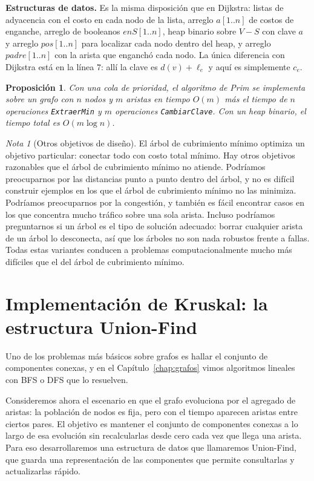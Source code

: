 \documentclass[12pt, spanish, oneside, openany]{book}
\newenvironment{estructuras}%
  {\begin{center}\begin{minipage}{0.93\textwidth}\begin{mdframed}[style=estrbox]%
   \small\textbf{Estructuras de datos.}\;}%
  {\end{mdframed}\end{minipage}\end{center}}
\theoremstyle{uprightplain}
\newtheorem{proposicion}[teorema]{Proposición}
\theoremstyle{definition}
\theoremstyle{remark}
\newtheorem{nota}[teorema]{Nota}
\theoremstyle{definition}
\begin{document}
\begin{estructuras}
Es la misma disposición que en Dijkstra: listas de adyacencia con el costo en
cada nodo de la lista, arreglo $a[1..n]$ de costos de enganche, arreglo de
booleanos $\mathit{enS}[1..n]$, heap binario sobre $V-S$ con clave $a$ y
arreglo $\mathit{pos}[1..n]$ para localizar cada nodo dentro del heap, y
arreglo $\mathit{padre}[1..n]$ con la arista que enganchó cada nodo. La única
diferencia con Dijkstra está en la línea $7$: allí la clave es $d(v)+\ell_e$ y
aquí es simplemente $c_e$.
\end{estructuras}

\begin{proposicion}
\label{prop:prim-tiempo}
Con una cola de prioridad, el algoritmo de Prim se implementa sobre un grafo con $n$ nodos y $m$ aristas en tiempo $O(m)$ más el tiempo de $n$ operaciones \texttt{ExtraerMin} y $m$ operaciones \texttt{CambiarClave}. Con un heap binario, el tiempo total es $O(m\log n)$.
\end{proposicion}

\begin{nota}[Otros objetivos de diseño]
El árbol de cubrimiento mínimo optimiza un objetivo particular: conectar todo con costo total mínimo. Hay otros objetivos razonables que el árbol de cubrimiento mínimo no atiende. Podríamos preocuparnos por las distancias punto a punto dentro del árbol, y no es difícil construir ejemplos en los que el árbol de cubrimiento mínimo no las minimiza. Podríamos preocuparnos por la congestión, y también es fácil encontrar casos en los que concentra mucho tráfico sobre una sola arista. Incluso podríamos preguntarnos si un árbol es el tipo de solución adecuado: borrar cualquier arista de un árbol lo desconecta, así que los árboles no son nada robustos frente a fallas. Todas estas variantes conducen a problemas computacionalmente mucho más difíciles que el del árbol de cubrimiento mínimo.
\end{nota}


\section{Implementación de Kruskal: la estructura Union-Find}
\label{sec:union-find}

Uno de los problemas más básicos sobre grafos es hallar el conjunto de componentes conexas, y en el Capítulo~\ref{chap:grafos} vimos algoritmos lineales con BFS o DFS que lo resuelven.

Consideremos ahora el escenario en que el grafo evoluciona por el agregado de aristas: la población de nodos es fija, pero con el tiempo aparecen aristas entre ciertos pares. El objetivo es mantener el conjunto de componentes conexas a lo largo de esa evolución sin recalcularlas desde cero cada vez que llega una arista. Para eso desarrollaremos una estructura de datos que llamaremos Union-Find, que guarda una representación de las componentes que permite consultarlas y actualizarlas rápido.
\end{document}
